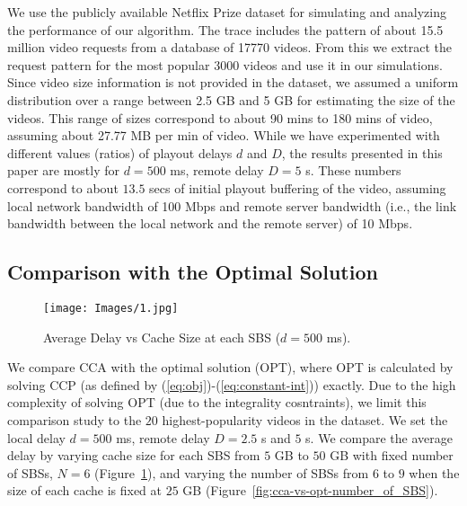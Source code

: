 \documentclass[conference]{IEEEtran}
\begin{document}

We use the publicly available Netflix Prize dataset \cite{Bennett07thenetflix} for simulating and analyzing the performance of our algorithm. 
The trace includes the pattern of about 15.5 million video requests from a database of 17770 videos. From this we extract the request pattern for the most popular 3000 videos and use it in our simulations. Since video size information is not provided in the dataset, we assumed a uniform distribution over a range between 2.5 GB and 5 GB for estimating the size of the videos. This range of sizes correspond to about 90 mins to 180 mins of video, assuming about 27.77 MB per min of video. While we have experimented with different values (ratios) of playout delays $d$ and $D$, the results presented in this paper are mostly for  $d = 500$ ms, remote delay $D = 5$ s. These numbers correspond to about $13.5$ secs of initial playout buffering of the video, assuming local network bandwidth of 100 Mbps and remote server bandwidth (i.e., the link bandwidth between the local network and the remote server) of 10 Mbps. 

\subsection{Comparison with the Optimal Solution}
\begin{figure}[htb]
    \centering
    \vspace{-0.2cm}
     \texttt{[image: Images/1.jpg]}
     \vspace{-0.1cm}
    \caption{Average Delay vs Cache Size at each SBS ($d = 500$ ms).}
    \vspace{-0.1cm}
    \label{fig:cca-vs-opt-cache_size}
\end{figure}

We compare CCA with the optimal solution (OPT), where OPT is calculated by solving CCP (as defined by (\ref{eq:obj})-(\ref{eq:constant-int})) exactly. Due to the high complexity of solving OPT (due to the integrality cosntraints), we limit this comparison study to the $20$ highest-popularity videos in the dataset.
We set the local delay $d = 500$ ms, remote delay $D = 2.5$ s and $5$ s. We compare the average delay by varying cache size for each SBS from $5$ GB to $50$ GB with fixed number of SBSs, $N = 6$ (Figure~\ref{fig:cca-vs-opt-cache_size}), and varying the number of SBSs from $6$ to $9$ when the size of each cache is fixed at $25$ GB (Figure~\ref{fig:cca-vs-opt-number_of_SBS}).
\end{document}
